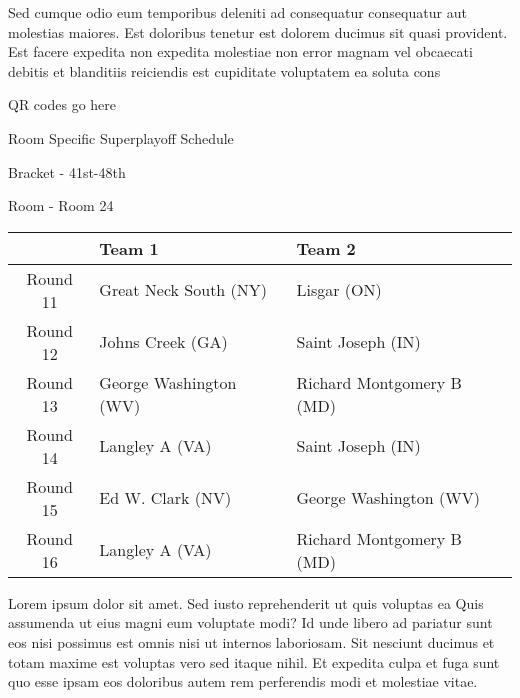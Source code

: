 \documentclass{article}%
\begin{document}
\newline%
    Sed cumque odio eum temporibus deleniti ad consequatur consequatur aut molestias maiores. Est doloribus tenetur est dolorem ducimus sit quasi provident. Est facere expedita non expedita molestiae non error magnam vel obcaecati debitis et blanditiis reiciendis est cupiditate voluptatem ea soluta cons%
\vspace*{140pt}%
\begin{center}%
\begin{Huge}%
QR codes go here%
\end{Huge}%
\end{center}%
\newpage%
\begin{center}%
\begin{Huge}%
Room Specific Superplayoff Schedule%
\end{Huge}%
\vspace*{8pt}%
\linebreak%
\begin{Large}%
Bracket {-} 41st{-}48th%
\end{Large}%
\vspace*{8pt}%
\linebreak%
\vspace*{8pt}%
\begin{Large}%
Room {-} Room 24%
\end{Large}%
\end{center}%
%
\begin{tabularx}{\textwidth}{|c|Y|Y|}%
\hline%
&Team 1&Team 2\\%
\hline%
Round 11&Great Neck South (NY)&Lisgar (ON)\\%
Round 12&Johns Creek (GA)&Saint Joseph (IN)\\%
Round 13&George Washington (WV)&Richard Montgomery B (MD)\\%
Round 14&Langley A (VA)&Saint Joseph (IN)\\%
Round 15&Ed W. Clark (NV)&George Washington (WV)\\%
Round 16&Langley A (VA)&Richard Montgomery B (MD)\\%
\hline%
\end{tabularx}%
\vspace*{8pt}%
\newline%
    Lorem ipsum dolor sit amet. Sed iusto reprehenderit ut quis voluptas ea Quis assumenda ut eius magni eum voluptate modi? Id unde libero ad pariatur sunt eos nisi possimus est omnis nisi ut internos laboriosam. Sit nesciunt ducimus et totam maxime est voluptas vero sed itaque nihil. Et expedita culpa et fuga sunt quo esse ipsam eos doloribus autem rem perferendis modi et molestiae vitae.\newline%
\end{document}
